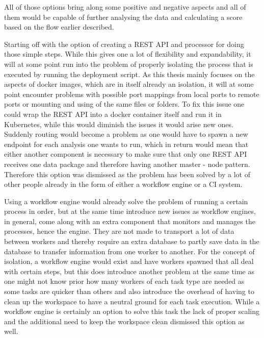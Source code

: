 All of those options bring along some positive and negative aspects and all of them would be capable of further analysing the data and calculating a score based on the flow earlier described.

Starting off with the option of creating a REST API and processor for doing those simple steps. While this gives one a lot of flexibility and expandability, it will at some point run into the problem of properly isolating the process that is executed by running the deployment script. As this thesis mainly focuses on the aspects of docker images, which are in itself already an isolation, it will at some point encounter problems with possible port mappings from local ports to remote ports or mounting and using of the same files or folders. To fix this issue one could wrap the REST API into a docker container itself and run it in Kubernetes, while this would diminish the issues it would arise new ones. Suddenly routing would become a problem as one would have to spawn a new endpoint for each analysis one wants to run, which in return would mean that either another component is necessary to make sure that only one REST API receives one data package and therefore having another master - node pattern.
Therefore this option was dismissed as the problem has been solved by a lot of other people already in the form of either a workflow engine or a CI system.

Using a workflow engine would already solve the problem of running a certain process in order, but at the same time introduce new issues as workflow engines, in general, come along with an extra component that monitors and manages the processes, hence the engine. They are not made to transport a lot of data between workers and thereby require an extra database to partly save data in the database to transfer information from one worker to another. For the concept of isolation, a workflow engine would exist and have workers spawned that all deal with certain steps, but this does introduce another problem at the same time as one might not know prior how many workers of each task type are needed as some tasks are quicker than others and also introduce the overhead of having to clean up the workspace to have a neutral ground for each task execution. While a workflow engine is certainly an option to solve this task the lack of proper scaling and the additional need to keep the workspace clean dismissed this option as well.


